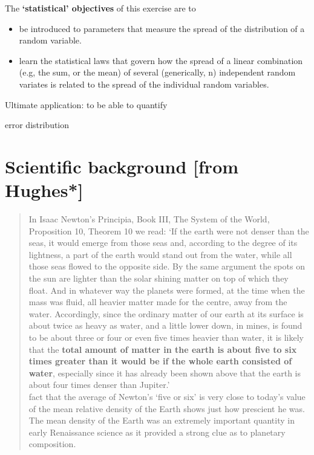 \documentclass[]{book}
\begin{document}
The \textbf{`statistical' objectives} of this exercise are to

\begin{itemize}
\item
  be introduced to parameters that measure the spread of the distribution of a random variable.
\item
  learn the statistical laws that govern how the spread of a linear combination (e.g, the sum, or the mean) of several (generically, n) independent random variates is related to the spread of the individual random variables.
\end{itemize}

Ultimate application: to be able to quantify

error distribution

\hypertarget{scientific-background-from-hughes-1}{%
\section{Scientific background {[}from Hughes*{]}}\label{scientific-background-from-hughes-1}}

\begin{quote}
In Isaac Newton's Principia, Book III, The System of the World, Proposition 10, Theorem 10 we read: `If the earth were not denser than the seas, it would emerge from those seas and, according to the degree of its lightness, a part of the earth would stand out from the water, while all those seas flowed to the opposite side. By the same argument the spots on the sun are lighter than the solar shining matter on top of which they float. And in whatever way the planets were formed, at the time when the mass was fluid, all heavier matter made for the centre, away from the water. Accordingly, since the ordinary matter of our earth at its surface is about twice as heavy as water, and a little lower down, in mines, is found to be about three or four or even five times heavier than water, it is likely that the \textbf{total amount of matter in the earth is about five to six times greater than it would be if the whole earth consisted of water}, especially since it has already been shown above that the earth is about four times denser than Jupiter.'\\
\hspace*{0.333em}\hspace*{0.333em}\hspace*{0.333em}\The fact that the average of Newton's `five or six' is very close to today's value of the mean relative density of the Earth shows just how prescient he was. The mean density of the Earth was an extremely important quantity in early Renaissance science as it provided a strong clue as to planetary composition.
\end{quote}
\end{document}
